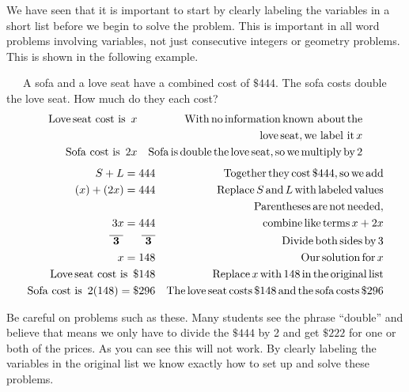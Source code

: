  We have seen that it is important to start by clearly labeling the variables in
a short list before we begin to solve the problem. This is important in all
word problems involving variables, not just consecutive integers or geometry
problems. This is shown in the following example.

\begin{example}\label{Lin81}~~~A sofa and a love seat have a combined cost of $\$444$. The sofa costs
  double the love seat. How much do they each cost?
  \begin{eqnarray*}
    \operatorname{Love} \operatorname{seat~cost~is~} x &  & \operatorname{With} \operatorname{no} \operatorname{information}
    \operatorname{known~about} \operatorname{the}\\
		& & ~~~\operatorname{love} \operatorname{seat}, \operatorname{we~label~it} x\\
    \operatorname{Sofa~cost~is~} 2 x &  & \operatorname{Sofa} \operatorname{is} \operatorname{double} \operatorname{the}
  	\operatorname{love} \operatorname{seat}, \operatorname{so} \operatorname{we} \operatorname{multiply} \operatorname{by} 2
  \end{eqnarray*}
  \begin{eqnarray*}
	  S + L = 444 &  & \operatorname{Together} \operatorname{they} \operatorname{cost} \$444, \operatorname{so}
    \operatorname{we} \operatorname{add}\\
    (x) + (2 x) = 444 &  & \operatorname{Replace} S \operatorname{and} L \operatorname{with}
    \operatorname{labeled} \operatorname{values}\\
    &  & \operatorname{Parentheses} \operatorname{are} \operatorname{not} \operatorname{needed},\\
		3 x = 444 & & ~~~ \operatorname{combine} \operatorname{like} \operatorname{terms} x + 2x\\
    \boldsymbol{\overline{~3~} ~~~~~ \overline{~3~}} &  & \operatorname{Divide} \operatorname{both}
    \operatorname{sides} \operatorname{by} 3\\
    x = 148 &  & \operatorname{Our} \operatorname{solution} \operatorname{for} x\\
    \operatorname{Love} \operatorname{seat~cost~is~} \$148 &  & \operatorname{Replace} x \operatorname{with} 148
    \operatorname{in} \operatorname{the} \operatorname{original} \operatorname{list}\\
    \operatorname{Sofa~cost~is~} 2 (148) = \$296 &  & \operatorname{The} \operatorname{love} \operatorname{seat}
    \operatorname{costs} \$148 \operatorname{and} \operatorname{the} \operatorname{sofa} \operatorname{costs}
    \$296
  \end{eqnarray*}
\end{example}

 Be careful on problems such as these. Many students see the phrase ``double''
and believe that means we only have to divide the $\$444$ by 2 and get
$\$222$ for one or both of the prices. As you can see this will not
work. By clearly labeling the variables in the original list we know exactly
how to set up and solve these problems.
